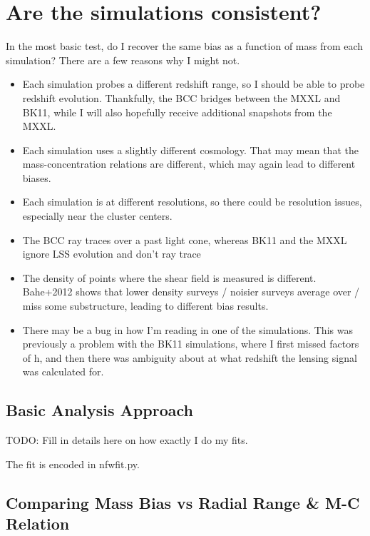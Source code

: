 \documentclass[11pt]{article}
\begin{document}
\section{Are the simulations consistent?}

In the most basic test, do I recover the same bias as a function of mass from each simulation? There are a few reasons why I might not. 

\begin{itemize}
\item Each simulation probes a different redshift range, so I should be able to probe redshift evolution. Thankfully, the BCC bridges between the MXXL and BK11, while I will also hopefully receive additional snapshots from the MXXL. 
\item Each simulation uses a slightly different cosmology. That may mean that the mass-concentration relations are different, which may again lead to different biases. 
\item Each simulation is at different resolutions, so there could be resolution issues, especially near the cluster centers. 
\item The BCC ray traces over a past light cone, whereas BK11 and the MXXL ignore LSS evolution and don't ray trace
\item The density of points where the shear field is measured is different. Bahe+2012 shows that lower density surveys / noisier surveys average over / miss some substructure, leading to different bias results.
\item There may be a bug in how I'm reading in one of the simulations. This was previously a problem with the BK11 simulations, where I first missed factors of h, and then there was ambiguity about at what redshift the lensing signal was calculated for.
\end{itemize}

\subsection{Basic Analysis Approach}

TODO: Fill in details here on how exactly I do my fits.

The fit is encoded in nfwfit.py. 


\subsection{Comparing Mass Bias vs Radial Range \& M-C Relation}
\label{sec:consistant_bias_mcrelation}
\end{document}
